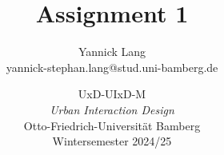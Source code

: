 \documentclass{article}
\title{Assignment 1}
\author{Yannick Lang\\
    \small yannick-stephan.lang@stud.uni-bamberg.de}
\date{ \vspace{0.5cm} \large 
UxD-UIxD-M\\ 
  \emph{Urban Interaction Design} \\ \vspace{0.2cm}
  Otto-Friedrich-Universität Bamberg \\ \vspace{0.2cm}
  Wintersemester 2024/25}
\begin{document}
\newcommand{\IIC}{I\textsuperscript{2}C}

\maketitle



\printbibliography
\end{document}
